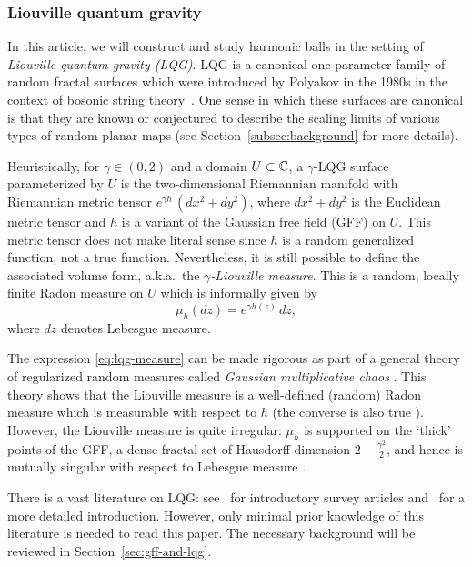\documentclass[12pt]{amsart}
\numberwithin{equation}{section}
\begin{document}
	\subsubsection{Liouville quantum gravity}
	In this article, we will construct and study harmonic balls in the setting of \textit{Liouville quantum gravity (LQG)}. LQG is a canonical one-parameter family of random fractal surfaces which were introduced by Polyakov in the 1980s in the context of bosonic string theory~\cite{polyakov-qg1}. One sense in which these surfaces are canonical is that they are known or conjectured to describe the scaling limits of various types of random planar maps (see Section~\ref{subsec:background} for more details).  
	
	Heuristically, for $\gamma \in (0,2)$ and a domain $U\subset\mathbb{C}$, a $\gamma$-LQG surface parameterized by $U$ is the two-dimensional Riemannian manifold with Riemannian metric tensor $e^{\gamma h} \, (dx^2+dy^2)$, where $dx^2+dy^2$ is the Euclidean metric tensor and $h$ is a variant of the Gaussian free field (GFF) on $U$. This metric tensor does not make literal sense since $h$ is a random generalized function, not a true function. Nevertheless, it is still possible to define the associated volume form, a.k.a.\ the \textit{$\gamma$-Liouville measure}. This is a random, locally finite Radon measure on $U$ which is informally given by
	\begin{equation} \label{eq:lqg-measure}
	\mu_h(dz) = e^{\gamma h(z)} \, dz  ,
	\end{equation}
	where $dz$ denotes Lebesgue measure. 
	
	The expression \eqref{eq:lqg-measure} can be made rigorous as part of a general theory 
	of regularized random measures called {\it Gaussian multiplicative chaos} \cite{kahane1985chaos, robert2010gaussian, rhodes2014gaussian}. This theory shows that the Liouville measure is a well-defined (random) Radon measure which is measurable with 
	respect to $h$ (the converse is also true \cite{berestycki2014equivalence}). However, the Liouville measure is quite irregular: $\mu_h$ is supported on the `thick' points of the GFF, a dense fractal set of Hausdorff dimension $2- \frac{\gamma^2}{2}$, and hence is mutually singular with respect to Lebesgue measure \cite{duplantier2011liouville, hu2010thick}.
	
	There is a vast literature on LQG: see~\cite{gwynne2020random,sheffield-icm} for introductory survey articles and~\cite{berestycki2021gaussian} for a more detailed introduction. However, only minimal prior knowledge of this literature is needed to read this paper. 
	The necessary background will be reviewed in Section~\ref{sec:gff-and-lqg}.
	
\end{document}

